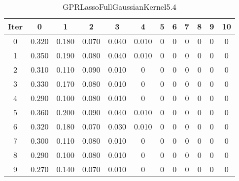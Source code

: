 \begin{table}
	\begin{center}
		\begin{tabular}{|c|c|c|c|c|c|c|c|c|c|c|c|}
			\hline
			Iter & 0 & 1 & 2 & 3 & 4 & 5 & 6 & 7 & 8 & 9 & 10 \\
			\hline
			0 & 0.320 & 0.180 & 0.070 & 0.040 & 0.010 & 0 & 0 & 0 & 0 & 0 & 0 \\
			\hline
			1 & 0.350 & 0.190 & 0.080 & 0.040 & 0.010 & 0 & 0 & 0 & 0 & 0 & 0 \\
			\hline
			2 & 0.310 & 0.110 & 0.090 & 0.010 & 0 & 0 & 0 & 0 & 0 & 0 & 0 \\
			\hline
			3 & 0.330 & 0.170 & 0.080 & 0.010 & 0 & 0 & 0 & 0 & 0 & 0 & 0 \\
			\hline
			4 & 0.290 & 0.100 & 0.080 & 0.010 & 0 & 0 & 0 & 0 & 0 & 0 & 0 \\
			\hline
			5 & 0.360 & 0.200 & 0.090 & 0.040 & 0.010 & 0 & 0 & 0 & 0 & 0 & 0 \\
			\hline
			6 & 0.320 & 0.180 & 0.070 & 0.030 & 0.010 & 0 & 0 & 0 & 0 & 0 & 0 \\
			\hline
			7 & 0.300 & 0.110 & 0.080 & 0.010 & 0 & 0 & 0 & 0 & 0 & 0 & 0 \\
			\hline
			8 & 0.290 & 0.100 & 0.080 & 0.010 & 0 & 0 & 0 & 0 & 0 & 0 & 0 \\
			\hline
			9 & 0.270 & 0.140 & 0.070 & 0.010 & 0 & 0 & 0 & 0 & 0 & 0 & 0 \\
			\hline
		\end{tabular}
	\end{center}
	\caption{GPRLassoFullGaussianKernel5.4}
\end{table}
